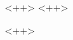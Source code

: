 \begin{table}
\centering
\begin{tabular}{<++>}
<++>
\end{tabular}
\caption{<++>}
\label{tab:<++>}
\end{table}
<++>
